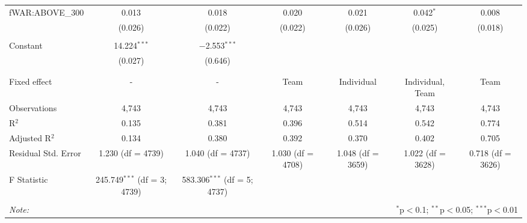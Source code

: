 \begin{table}[!htbp]
\begin{tabular}{@{\extracolsep{5pt}}lcccccc}
 fWAR:ABOVE\_300 & 0.013 & 0.018 & 0.020 & 0.021 & 0.042$^{*}$ & 0.008 \\
  & (0.026) & (0.022) & (0.022) & (0.026) & (0.025) & (0.018) \\
  & & & & & & \\
 Constant & 14.224$^{***}$ & $-$2.553$^{***}$ &  &  &  &  \\
  & (0.027) & (0.646) &  &  &  &  \\
  & & & & & & \\
\hline \\[-1.8ex]
Fixed effect & - & - & Team & Individual & Individual, Team & Team \\
Observations & 4,743 & 4,743 & 4,743 & 4,743 & 4,743 & 4,743 \\
R$^{2}$ & 0.135 & 0.381 & 0.396 & 0.514 & 0.542 & 0.774 \\
Adjusted R$^{2}$ & 0.134 & 0.380 & 0.392 & 0.370 & 0.402 & 0.705 \\
Residual Std. Error & 1.230 (df = 4739) & 1.040 (df = 4737) & 1.030 (df = 4708) & 1.048 (df = 3659) & 1.022 (df = 3628) & 0.718 (df = 3626) \\
F Statistic & 245.749$^{***}$ (df = 3; 4739) & 583.306$^{***}$ (df = 5; 4737) &  &  &  &  \\
\hline
\hline \\[-1.8ex]
\textit{Note:}  & \multicolumn{6}{r}{$^{*}$p$<$0.1; $^{**}$p$<$0.05; $^{***}$p$<$0.01} \\
\end{tabular}
\end{table}
